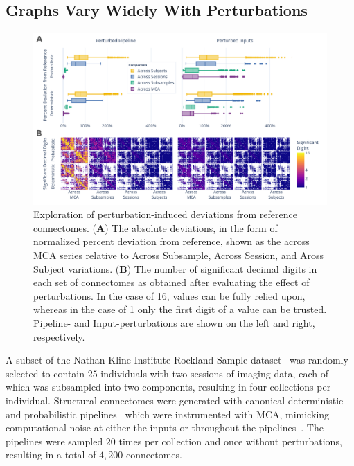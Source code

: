\documentclass[fleqn,10pt]{SelfArx} %
\begin{document}
\subsection*{Graphs Vary Widely With Perturbations}
\begin{figure}[hbt]\centering
\includegraphics[width=0.98\linewidth]{figures/fig1_absolute_differences.pdf}
\caption{Exploration of perturbation-induced deviations from reference connectomes.
(\textbf{A}) The absolute deviations, in the form of normalized percent deviation from reference, shown as the
across MCA series relative to Across Subsample, Across Session, and Aross Subject variations.
(\textbf{B}) The number of significant decimal digits in each set of connectomes as obtained after evaluating the
effect of perturbations. In the case of 16, values can be fully relied upon, whereas in the case of 1 only the first
digit of a value can be trusted. Pipeline- and Input-perturbations are shown on the left and right, respectively.}
\label{fig:absolute}
\end{figure}

A subset of the Nathan Kline Institute Rockland Sample dataset~\cite{Nooner2012-eg} was randomly selected to contain
$25$ individuals with two sessions of imaging data, each of which was subsampled into two components, resulting in four
collections per individual. Structural connectomes were generated with canonical deterministic and probabilistic
pipelines~\cite{Garyfallidis2014-ql,Garyfallidis2012-gg} which were instrumented with MCA, mimicking computational
noise at either the inputs or throughout the pipelines~\cite{Denis2016-wo,Kiar2020-lb}. The pipelines were sampled $20$
times per collection and once without perturbations, resulting in a total of $4,200$ connectomes.
\end{document}
